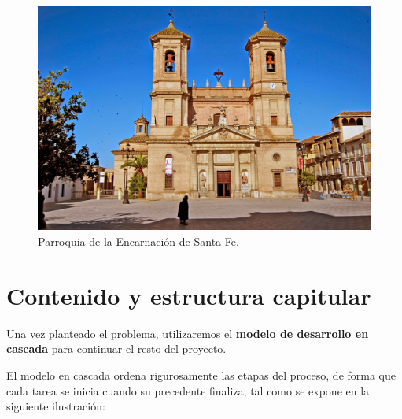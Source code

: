 \begin{figure}[H]
\noindent \begin{centering}
\includegraphics[width=\linewidth]{capitulo1/figura11}
\par\end{centering}
\smallskip
\caption{\label{fig:figura11} Parroquia de la Encarnación de Santa Fe.}
\end{figure} 

\newpage

\section{Contenido y estructura capitular}

Una vez planteado el problema, utilizaremos el \textbf{modelo de desarrollo en cascada} para continuar el resto del proyecto.

El modelo en cascada ordena rigurosamente las etapas del proceso, de forma que cada tarea se inicia cuando su precedente finaliza, tal como se expone en la siguiente ilustración:

\smallskip

